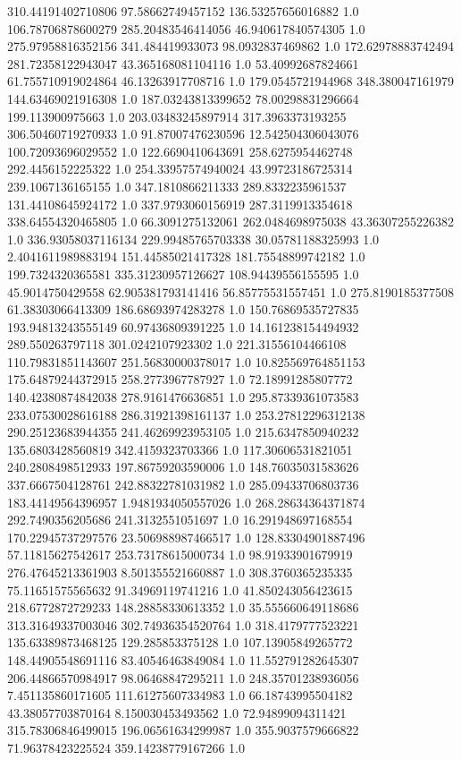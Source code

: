 310.44191402710806	97.58662749457152	136.53257656016882	1.0
106.78706878600279	285.20483546414056	46.940617840574305	1.0
275.97958816352156	341.484419933073	98.0932837469862	1.0
172.62978883742494	281.72358122943047	43.365168081104116	1.0
53.40992687824661	61.755710919024864	46.13263917708716	1.0
179.0545721944968	348.380047161979	144.63469021916308	1.0
187.03243813399652	78.00298831296664	199.113900975663	1.0
203.03483245897914	317.3963373193255	306.50460719270933	1.0
91.87007476230596	12.542504306043076	100.72093696029552	1.0
122.6690410643691	258.6275954462748	292.4456152225322	1.0
254.33957574940024	43.99723186725314	239.1067136165155	1.0
347.1810866211333	289.8332235961537	131.44108645924172	1.0
337.9793060156919	287.3119913354618	338.64554320465805	1.0
66.3091275132061	262.0484698975038	43.36307255226382	1.0
336.93058037116134	229.99485765703338	30.05781188325993	1.0
2.4041611989883194	151.44585021417328	181.75548899742182	1.0
199.7324320365581	335.31230957126627	108.94439556155595	1.0
45.9014750429558	62.905381793141416	56.85775531557451	1.0
275.8190185377508	61.38303066413309	186.68693974283278	1.0
150.76869535727835	193.94813243555149	60.97436809391225	1.0
14.161238154494932	289.550263797118	301.0242107923302	1.0
221.31556104466108	110.79831851143607	251.56830000378017	1.0
10.825569764851153	175.64879244372915	258.2773967787927	1.0
72.18991285807772	140.42380874842038	278.9161476636851	1.0
295.87339361073583	233.07530028616188	286.31921398161137	1.0
253.27812296312138	290.25123683944355	241.46269923953105	1.0
215.6347850940232	135.6803428560819	342.4159323703366	1.0
117.30606531821051	240.2808498512933	197.86759203590006	1.0
148.76035031583626	337.6667504128761	242.88322781031982	1.0
285.09433706803736	183.44149564396957	1.9481934050557026	1.0
268.28634364371874	292.7490356205686	241.3132551051697	1.0
16.291948697168554	170.22945737297576	23.506988987466517	1.0
128.83304901887496	57.11815627542617	253.73178615000734	1.0
98.91933901679919	276.47645213361903	8.501355521660887	1.0
308.3760365235335	75.11651575565632	91.34969119741216	1.0
41.850243056423615	218.6772872729233	148.28858330613352	1.0
35.555660649118686	313.31649337003046	302.74936354520764	1.0
318.4179777523221	135.63389873468125	129.285853375128	1.0
107.13905849265772	148.44905548691116	83.40546463849084	1.0
11.552791282645307	206.44866570984917	98.06468847295211	1.0
248.35701238936056	7.451135860171605	111.61275607334983	1.0
66.18743995504182	43.38057703870164	8.150030453493562	1.0
72.94899094311421	315.78306846499015	196.06561634299987	1.0
355.9037579666822	71.96378423225524	359.14238779167266	1.0
